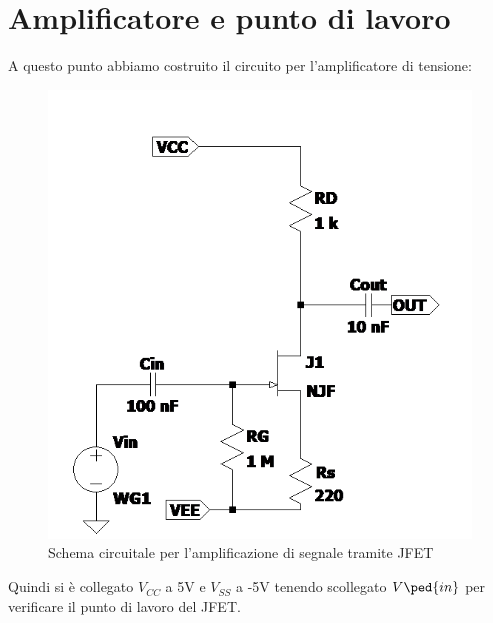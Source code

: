 \documentclass[10pt, a4paper, italian]{article}
\begin{document}
\section{Amplificatore e punto di lavoro}
A questo punto abbiamo costruito il circuito per l'amplificatore di tensione:
\begin{figure}[htbp]
    \centering
	\includegraphics[scale=0.7]{Draft2}
    \caption{Schema circuitale per l'amplificazione di segnale tramite JFET}
\end{figure}
Quindi si è collegato $V_{CC}$ a 5V e $V_{SS}$ a -5V tenendo scollegato $V\ped{in}$ per verificare il punto di lavoro del JFET.
\end{document}
